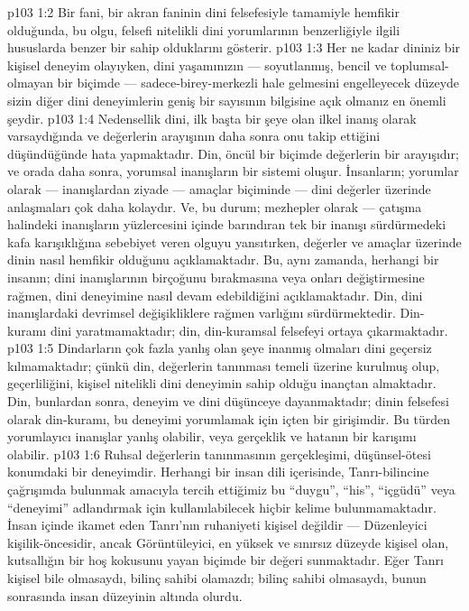 \vs p103 1:2 Bir fani, bir akran faninin dini felsefesiyle tamamiyle hemfikir olduğunda, bu olgu, felsefi nitelikli dini yorumlarının benzerliğiyle ilgili hususlarda benzer bir sahip olduklarını gösterir.
\vs p103 1:3 Her ne kadar dininiz bir kişisel deneyim olayıyken, dini yaşamınızın --- soyutlanmış, bencil ve toplumsal\hyp{}olmayan bir biçimde --- sadece\hyp{}birey\hyp{}merkezli hale gelmesini engelleyecek düzeyde sizin diğer dini deneyimlerin geniş bir sayısının bilgisine açık olmanız en önemli şeydir.
\vs p103 1:4 Nedensellik dini, ilk başta bir şeye olan ilkel inanış olarak varsaydığında ve değerlerin arayışının daha sonra onu takip ettiğini düşündüğünde hata yapmaktadır. Din, öncül bir biçimde değerlerin bir arayışıdır; ve orada daha sonra, yorumsal inanışların bir sistemi oluşur. İnsanların; yorumlar olarak --- inanışlardan ziyade --- amaçlar biçiminde --- dini değerler üzerinde anlaşmaları çok daha kolaydır. Ve, bu durum; mezhepler olarak --- çatışma halindeki inanışların yüzlercesini içinde barındıran tek bir inanışı sürdürmedeki kafa karışıklığına sebebiyet veren olguyu yansıtırken, değerler ve amaçlar üzerinde dinin nasıl hemfikir olduğunu açıklamaktadır. Bu, aynı zamanda, herhangi bir insanın; dini inanışlarının birçoğunu bırakmasına veya onları değiştirmesine rağmen, dini deneyimine nasıl devam edebildiğini açıklamaktadır. Din, dini inanışlardaki devrimsel değişikliklere rağmen varlığını sürdürmektedir. Din\hyp{}kuramı dini yaratmamaktadır; din, din\hyp{}kuramsal felsefeyi ortaya çıkarmaktadır.
\vs p103 1:5 Dindarların çok fazla yanlış olan şeye inanmış olmaları dini geçersiz kılmamaktadır; çünkü din, değerlerin tanınması temeli üzerine kurulmuş olup, geçerliliğini, kişisel nitelikli dini deneyimin sahip olduğu inançtan almaktadır. Din, bunlardan sonra, deneyim ve dini düşünceye dayanmaktadır; dinin felsefesi olarak din\hyp{}kuramı, bu deneyimi yorumlamak için içten bir girişimdir. Bu türden yorumlayıcı inanışlar yanlış olabilir, veya gerçeklik ve hatanın bir karışımı olabilir.
\vs p103 1:6 Ruhsal değerlerin tanınmasının gerçekleşimi, düşünsel\hyp{}ötesi konumdaki bir deneyimdir. Herhangi bir insan dili içerisinde, Tanrı\hyp{}bilincine çağrışımda bulunmak amacıyla tercih ettiğimiz bu “duygu”, “his”, “içgüdü” veya “deneyimi” adlandırmak için kullanılabilecek hiçbir kelime bulunmamaktadır. İnsan içinde ikamet eden Tanrı’nın ruhaniyeti kişisel değildir --- Düzenleyici kişilik\hyp{}öncesidir, ancak Görüntüleyici, en yüksek ve sınırsız düzeyde kişisel olan, kutsallığın bir hoş kokusunu yayan biçimde bir değeri sunmaktadır. Eğer Tanrı kişisel bile olmasaydı, bilinç sahibi olamazdı; bilinç sahibi olmasaydı, bunun sonrasında insan düzeyinin altında olurdu.
